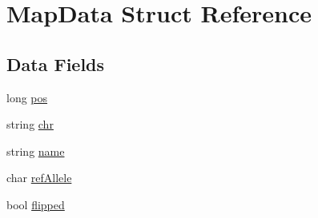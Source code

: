 \hypertarget{structMapData}{
\section{MapData Struct Reference}
\label{structMapData}
}
\subsection*{Data Fields}
\begin{DoxyCompactItemize}
\item 
long \hyperlink{structMapData_a39c0ddcd241418ae2cb9c768e542b16f}{pos}
\item 
string \hyperlink{structMapData_a3d422e5b31b80cc7c4538a68af566574}{chr}
\item 
string \hyperlink{structMapData_ad4f885d78b08c2cf7bab7b75a014eb94}{name}
\item 
char \hyperlink{structMapData_a26658a6770ee7316368ebcaaf6d9e9e5}{refAllele}
\item 
bool \hyperlink{structMapData_a72b529932979ffbcda46669cb342a4c8}{flipped}
\end{DoxyCompactItemize}



